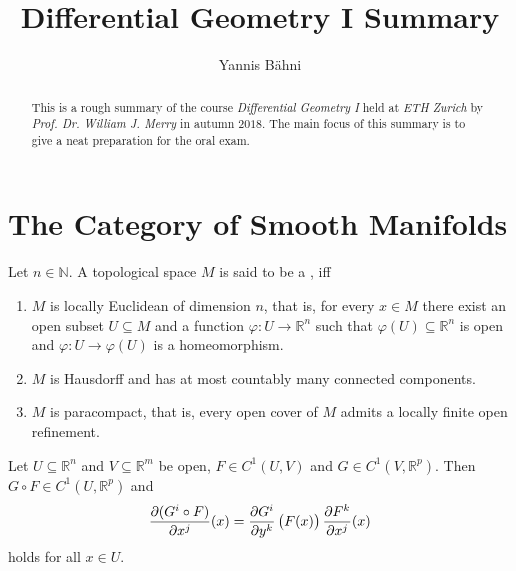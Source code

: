 

\setcounter{section}{1}

\title{Differential Geometry I Summary}
\author{Yannis B\"{a}hni}
\address[Yannis B\"{a}hni]{ETH Zurich, R\"{a}mistrasse 101, 8092 Zurich}



\begin{abstract}
	This is a rough summary of the course \emph{Differential Geometry I} held at \emph{ETH Zurich} by \emph{Prof. Dr. William J. Merry} in autumn $2018$. The main focus of this summary is to give a neat preparation for the oral exam.
\end{abstract}

\maketitle

\tableofcontents

\section*{The Category of Smooth Manifolds}

\begin{definition}
	Let $n \in \mathbb{N}$. A topological space $M$ is said to be a , iff
	\begin{enumerate}[label = \textup{(\roman*)},leftmargin=*]
		\item $M$ is locally Euclidean of dimension $n$, that is, for every $x \in M$ there exist an open subset $U \subseteq M$ and a function $\varphi : U \to \mathbb{R}^n$ such that $\varphi(U) \subseteq \mathbb{R}^n$ is open and $\varphi : U \to \varphi(U)$ is a homeomorphism.
		\item $M$ is Hausdorff and has at most countably many connected components.
		\item $M$ is paracompact, that is, every open cover of $M$ admits a locally finite open refinement.
	\end{enumerate}
\end{definition}

\begin{proposition}
	Let $U \subseteq \mathbb{R}^n$ and $V \subseteq \mathbb{R}^m$ be open, $F \in C^1(U,V)$ and $G \in C^1(V,\mathbb{R}^p)$. Then $G \circ F \in C^1(U,\mathbb{R}^p)$ and
	\begin{equation*}
		\frac{\partial(G^i \circ F)}{\partial x^j}(x) = \frac{\partial G^i}{\partial y^k}\del[1]{F(x)}\frac{\partial F^k}{\partial x^j}(x)
	\end{equation*}
	\noindent holds for all $x \in U$.
\end{proposition}


